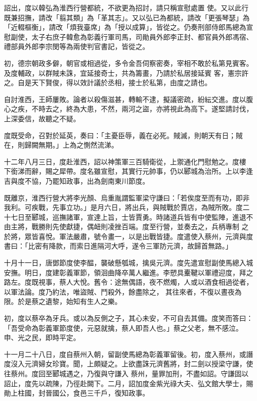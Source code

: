 \begin{pinyinscope}
 詔出，度以韓弘為淮西行營都統，不欲更為招討，請只稱宣慰處置
 使。又以此行既兼招撫，請改「翦其類」為「革其志」。又以弘已為都統，請改「更張琴瑟」為「近輟樞衡」，請改「煩我臺席」為「授以成算」，皆從之。仍奏刑部侍郎馬總為宣慰副使，太子右庶子韓愈為彰義行軍司馬，司勛員外郎李正封、都官員外郎馮宿、禮部員外郎李宗閔等為兩使判官書記，皆從之。



 初，德宗朝政多僻，朝官或相過從，多令金吾伺察密奏，宰相不敢於私第見賓客。及度輔政，以群賊未誅，宜延接奇士，共為籌畫，乃請於私居接延賓
 客，憲宗許之。自是天下賢俊，得以效計議於丞相，接士於私第，由度之請也。



 自討淮西，王師屢敗。論者以殺傷滋甚，轉輸不逮，擬議密疏，紛紜交進。度以腹心之疾，不時去之，終為大患，不然，兩河之盜，亦將視此為高下。遂堅請討伐，上深委信，故聽之不疑。



 度既受命，召對於延英，奏曰：「主憂臣辱，義在必死。賊滅，則朝天有日；賊在，則歸闕無期。」上為之惻然流涕。



 十二年八月三日，度赴淮西，詔以神策軍三百騎衛從，上禦通化門慰勉之。度樓
 下銜涕而辭，賜之犀帶。度名雖宣慰，其實行元帥事，仍以郾城為治所。上以李逢吉與度不協，乃罷知政事，出為劍南東川節度。



 既離京，淮西行營大將李光顏、烏重胤謂監軍梁守謙曰：「若俟度至而有功，即非我利。可疾戰，先事立功。」是月六日，將出兵，與賊戰於賈店，為賊所敗。度二十七日至郾城，巡撫諸軍，宣達上旨，士皆賈勇。時諸道兵皆有中使監陣，進退不由主將，戰勝則先使獻捷，偶衄則凌挫百端。度至行營，並奏去之，兵柄專制
 之於將，眾皆喜悅。軍法嚴肅，號令畫一，以是出戰皆捷。度遣使入蔡州，元濟與度書曰：「比密有降款，而索日進隔河大呼，遂令三軍防元濟，故歸首無路。」



 十月十一日，唐鄧節度使李醖，襲破懸瓠城，擒吳元濟。度先遣宣慰副使馬總入城安撫。明日，度建彰義軍節，領洄曲降卒萬人繼進。李愬具櫜鞬以軍禮迎度，拜之路左。度既視事，蔡人大悅。舊令：途無偶語，夜不燃燭，人或以酒食相過從者，以軍法論。度乃約法，唯盜賊、鬥殺外，餘盡除之，
 其往來者，不復以晝夜為限。於是蔡之遺黎，始知有生人之樂。



 初，度以蔡卒為牙兵。或以為反側之子，其心未安，不可自去其備。度笑而答曰：「吾受命為彰義軍節度使，元惡就擒，蔡人即吾人也。」蔡之父老，無不感泣。申、光之民，即時平定。



 十一月二十八日，度自蔡州入朝，留副使馬總為彰義軍留後。初，度入蔡州，或譖度沒入元濟婦女珍寶。聞，上頗疑之。上欲盡誅元濟舊將，封二劍以授梁守謙，使往蔡州。度回至郾城遇之，乃復與守謙入
 蔡州，量罪加刑，不盡如詔。守謙固以詔止，度先以疏陳，乃徑赴闕下。二月，詔加度金紫光祿大夫、弘文館大學士，賜勛上柱國，封晉國公，食邑三千戶，復知政事。




\end{pinyinscope}
